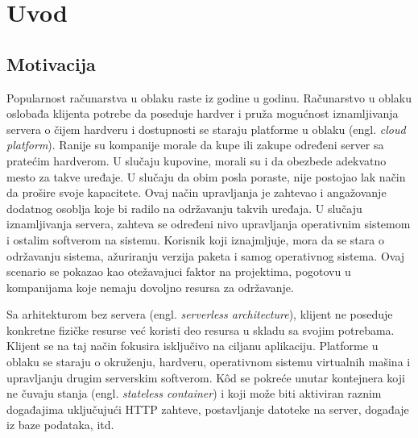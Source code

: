 \documentclass[12pt,oneside]{memoir}
\begin{document}
\frontmatter
\naslovna
\komisija
\apstrakt
\tableofcontents*

\mainmatter

\chapter{Uvod}

\section{Motivacija}
Popularnost računarstva u oblaku raste iz godine u godinu. Računarstvo u oblaku oslobađa klijenta potrebe da poseduje hardver i pruža mogućnost iznamljivanja servera o čijem hardveru i dostupnosti se staraju platforme u oblaku (engl. \emph{cloud platform}). Ranije su kompanije morale da kupe ili zakupe određeni server sa pratećim hardverom. U slučaju kupovine, morali su i da obezbede adekvatno mesto za takve uređaje. U slučaju da obim posla poraste, nije postojao lak način da prošire svoje kapacitete. Ovaj način upravljanja je zahtevao i angažovanje dodatnog osoblja koje bi radilo na održavanju takvih uređaja. U slučaju iznamljivanja servera, zahteva se određeni nivo upravljanja operativnim sistemom i ostalim softverom na sistemu. Korisnik koji iznajmljuje, mora da se stara o održavanju sistema, ažuriranju verzija paketa i samog operativnog sistema. Ovaj scenario se pokazao kao otežavajuci faktor na projektima, pogotovu u kompanijama koje nemaju dovoljno resursa za održavanje.

Sa arhitekturom bez servera (engl. \emph{serverless architecture}), klijent ne poseduje konkretne fizičke resurse već koristi deo resursa u skladu sa svojim potrebama. Klijent se na taj način fokusira isključivo na ciljanu aplikaciju. Platforme u oblaku se staraju o okruženju, hardveru, operativnom sistemu virtualnih mašina i upravljanju drugim serverskim softverom. Kôd se pokreće unutar kontejnera koji ne čuvaju stanja (engl. \emph{stateless container}) i koji može biti aktiviran raznim događajima uključujući HTTP zahteve, postavljanje datoteke na server, događaje iz baze podataka, itd.
\end{document}
